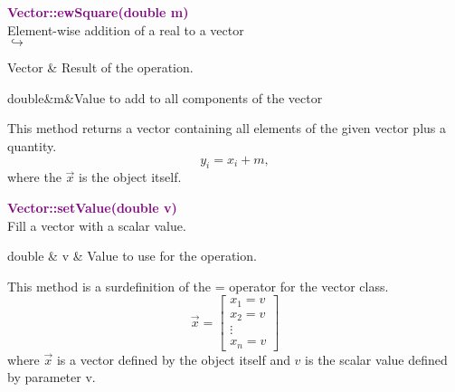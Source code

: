 \textcolor{purple}{\textbf{Vector::ewSquare(double m)}}\label{Vector::ewSquare(double m)}\\
Element-wise addition of a real to a vector\\ \hspace*{5mm}$\hookrightarrow$
\vspace*{-2em}\begin{tcolorbox}[grow to left by=-1cm, width=\textwidth-1cm,myArgs,tabularx={l|R}]
Vector & Result of the operation.
\end{tcolorbox}

\begin{tcolorbox}[width=\textwidth,myArgs,tabularx={ll|R}]
double&m&Value to add to all components of the vector
\end{tcolorbox}

This method returns a vector containing all elements of the given vector plus a quantity.
\begin{equation*}
y_i = x_i + m,
\end{equation*}
where the $\overrightarrow{x}$ is the object itself.

\textcolor{purple}{\textbf{Vector::setValue(double v)}}\label{Vector::setValue(double v)}\\
Fill a vector with a scalar value.

\begin{tcolorbox}[width=\textwidth,myArgs,tabularx={ll|R}]
double & v & Value to use for the operation.
\end{tcolorbox}

This method is a surdefinition of the = operator for the vector class.
\begin{equation*}
\overrightarrow{x}=\left[\begin{array}{c}
  x_{1}=v\\
  x_{2}=v\\
  \vdots\\
  x_{n}=v
  \end{array}\right]
\end{equation*}
where $\overrightarrow{x}$ is a vector defined by the object itself and $v$ is the scalar value defined by parameter v.

